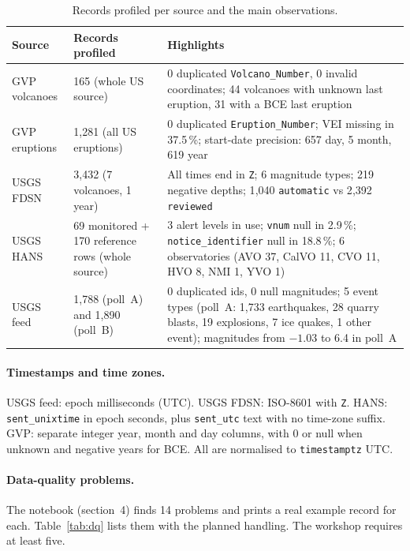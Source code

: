 \documentclass[11pt,a4paper]{article}
\begin{document}
\begin{table}[h]
\centering
\small
\setlength{\tabcolsep}{5pt}
\caption{Records profiled per source and the main observations.}
\label{tab:profiling}
\begin{tabular}{@{}L{2.4cm}L{4.4cm}L{8.4cm}@{}}
\toprule
\textbf{Source} & \textbf{Records profiled} & \textbf{Highlights} \\
\midrule
GVP volcanoes & 165 (whole US source) &
0 duplicated \texttt{Volcano\_Number}, 0 invalid coordinates; 44 volcanoes with
unknown last eruption, 31 with a BCE last eruption \\
\addlinespace
GVP eruptions & 1{,}281 (all US eruptions) &
0 duplicated \texttt{Eruption\_Number}; VEI missing in 37.5\,\%; start-date precision:
657 day, 5 month, 619 year \\
\addlinespace
USGS FDSN & 3{,}432 (7 volcanoes, 1 year) &
All times end in \texttt{Z}; 6 magnitude types; 219 negative depths; 1{,}040
\texttt{automatic} vs 2{,}392 \texttt{reviewed} \\
\addlinespace
USGS HANS & 69 monitored + 170 reference rows (whole source) &
3 alert levels in use; \texttt{vnum} null in 2.9\,\%; \texttt{notice\_identifier} null
in 18.8\,\%; 6 observatories (AVO 37, CalVO 11, CVO 11, HVO 8, NMI 1, YVO 1) \\
\addlinespace
USGS feed & 1{,}788 (poll~A) and 1{,}890 (poll~B) &
0 duplicated ids, 0 null magnitudes; 5 event types (poll~A: 1{,}733 earthquakes, 28
quarry blasts, 19 explosions, 7 ice quakes, 1 other event); magnitudes from $-1.03$
to 6.4 in poll~A \\
\bottomrule
\end{tabular}
\end{table}

\paragraph{Timestamps and time zones.}
USGS feed: epoch milliseconds (UTC). USGS FDSN: ISO-8601 with \texttt{Z}. HANS:
\texttt{sent\_unixtime} in epoch seconds, plus \texttt{sent\_utc} text with no
time-zone suffix. GVP: separate integer year, month and day columns, with 0 or null
when unknown and negative years for BCE. All are normalised to \texttt{timestamptz}
UTC.

\paragraph{Data-quality problems.}
The notebook (section~4) finds 14 problems and prints a real example record for each.
Table~\ref{tab:dq} lists them with the planned handling. The workshop requires at
least five.
\end{document}
